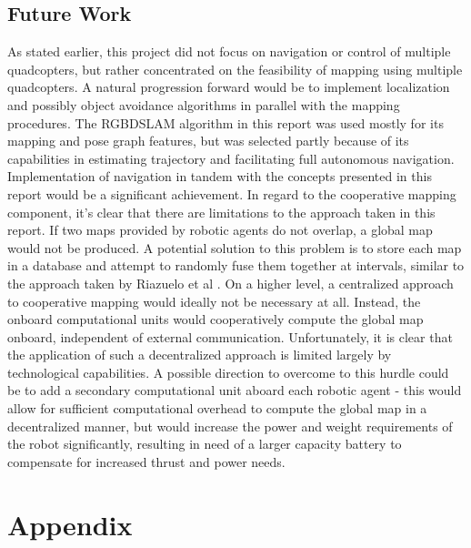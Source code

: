 \documentclass[letterpaper, oneside, 10pt]{report}
\begin{document}
\section{Future Work}

As stated earlier, this project did not focus on navigation or control of multiple quadcopters, but rather concentrated on the feasibility of mapping using multiple quadcopters. A natural progression forward would be to implement localization and possibly object avoidance algorithms in parallel with the mapping procedures. The RGBDSLAM algorithm in this report was used mostly for its mapping and pose graph features, but was selected partly because of its capabilities in estimating trajectory and facilitating full autonomous navigation. Implementation of navigation in tandem with the concepts presented in this report would be a significant achievement. In regard to the cooperative mapping component, it's clear that there are limitations to the approach taken in this report. If two maps provided by robotic agents do not overlap, a global map would not be produced. A potential solution to this problem is to store each map in a database and attempt to randomly fuse them together at intervals, similar to the approach taken by Riazuelo et al \cite{riazuelo2014c}. On a higher level, a centralized approach to cooperative mapping would ideally not be necessary at all. Instead, the onboard computational units would cooperatively compute the global map onboard, independent of external communication. Unfortunately, it is clear that the application of such a decentralized approach is limited largely by technological capabilities. A possible direction to overcome to this hurdle could be to add a secondary computational unit aboard each robotic agent - this would allow for sufficient computational overhead to compute the global map in a decentralized manner, but would increase the power and weight requirements of the robot significantly, resulting in need of a larger capacity battery to compensate for increased thrust and power needs.

\chapter{Appendix}
\end{document}
